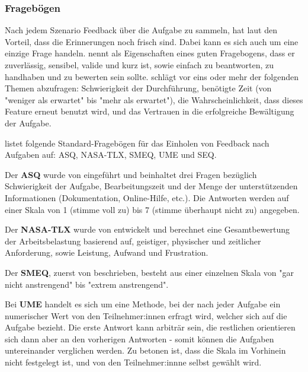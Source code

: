 \subsubsection{Fragebögen}

Nach jedem Szenario Feedback über die Aufgabe zu sammeln, hat laut \textcite{barnumUsabilityTesting2021} den Vorteil, dass die Erinnerungen noch frisch sind. Dabei kann es sich auch um eine einzige Frage handeln. \textcite{sauroIfYou2010} nennt als Eigenschaften eines guten Fragebogens, dass er zuverlässig, sensibel, valide und kurz ist, sowie einfach zu beantworten, zu handhaben und zu bewerten sein sollte. \textcite{barnumUsabilityTesting2021} schlägt vor eins oder mehr der folgenden Themen abzufragen: Schwierigkeit der Durchführung, benötigte Zeit (von "weniger als erwartet" bis "mehr als erwartet"), die Wahrscheinlichkeit, dass dieses Feature erneut benutzt wird, und das Vertrauen in die erfolgreiche Bewältigung der Aufgabe.

\textcite{sauroIfYou2010} listet folgende Standard-Fragebögen für das Einholen von Feedback nach Aufgaben auf: \ac{ASQ}, \ac{NASA-TLX}, \ac{SMEQ}, \ac{UME} und \ac{SEQ}. 

Der \textbf{\ac{ASQ}} wurde von \textcite{lewisPsychometricEvaluation1991} eingeführt und beinhaltet drei Fragen bezüglich Schwierigkeit der Aufgabe, Bearbeitungszeit und der Menge der unterstützenden Informationen (Dokumentation, Online-Hilfe, etc.). Die Antworten werden auf einer Skala von 1 (stimme voll zu) bis 7 (stimme überhaupt nicht zu) angegeben.

Der \textbf{\ac{NASA-TLX}} wurde von \textcite{hartDevelopmentNASATLX1988} entwickelt und berechnet eine Gesamtbewertung der Arbeitsbelastung basierend auf, geistiger, physischer und zeitlicher Anforderung, sowie Leistung, Aufwand und Frustration. \parencite{nasaNASATLX}

Der \textbf{\ac{SMEQ}}, zuerst von \textcite{zijlstraConstructionScale1985} beschrieben, besteht aus einer einzelnen Skala von "gar nicht anstrengend" bis "extrem anstrengend". 

Bei \textbf{\ac{UME}} handelt es sich um eine Methode, bei der nach jeder Aufgabe ein numerischer Wert von den Teilnehmer:innen erfragt wird, welcher sich auf die Aufgabe bezieht. Die erste Antwort kann arbiträr sein, die restlichen orientieren sich dann aber an den vorherigen Antworten - somit können die Aufgaben untereinander verglichen werden. Zu betonen ist, dass die Skala im Vorhinein nicht festgelegt ist, und von den Teilnehmer:innne selbst gewählt wird.
\parencite{mcgeeUsabilityMagnitude2003}

